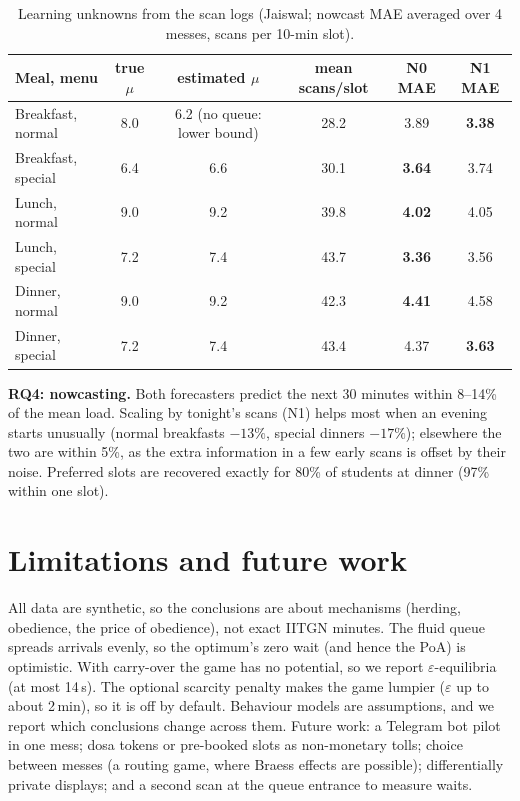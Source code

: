 \documentclass{article}
\begin{document}
\begin{table}[H]\centering\small
\caption{Learning unknowns from the scan logs (Jaiswal; nowcast MAE averaged over 4 messes, scans per 10-min slot).}\label{tab:data}
\begin{tabular}{lccccc}\toprule
Meal, menu & true $\mu$ & estimated $\mu$ & mean scans/slot & N0 MAE & N1 MAE\\\midrule
Breakfast, normal & 8.0 & 6.2 (no queue: lower bound) & 28.2 & 3.89 & \textbf{3.38}\\
Breakfast, special & 6.4 & 6.6 & 30.1 & \textbf{3.64} & 3.74\\
Lunch, normal & 9.0 & 9.2 & 39.8 & \textbf{4.02} & 4.05\\
Lunch, special & 7.2 & 7.4 & 43.7 & \textbf{3.36} & 3.56\\
Dinner, normal & 9.0 & 9.2 & 42.3 & \textbf{4.41} & 4.58\\
Dinner, special & 7.2 & 7.4 & 43.4 & 4.37 & \textbf{3.63}\\
\bottomrule\end{tabular}\end{table}

\noindent\textbf{RQ4: nowcasting.} Both forecasters predict the next 30 minutes within 8--14\% of the mean load.
Scaling by tonight's scans (N1) helps most when an evening starts unusually (normal breakfasts $-13\%$, special
dinners $-17\%$); elsewhere the two are within 5\%, as the extra information in a few early scans is offset by their
noise. Preferred slots are recovered exactly for 80\% of students at dinner (97\% within one slot).

\section{Limitations and future work}
All data are synthetic, so the conclusions are about mechanisms (herding, obedience, the price of obedience), not
exact IITGN minutes. The fluid queue spreads arrivals evenly, so the optimum's zero wait (and hence the PoA) is
optimistic. With carry-over the game has no potential, so we report $\varepsilon$-equilibria (at most 14\,s). The
optional scarcity penalty makes the game lumpier ($\varepsilon$ up to about 2\,min), so it is off by default. Behaviour
models are assumptions, and we report which conclusions change across them. Future work: a Telegram bot pilot in one
mess; dosa tokens or pre-booked slots as non-monetary tolls; choice between messes (a routing game, where Braess
effects are possible); differentially private displays; and a second scan at the queue entrance to measure waits.
\end{document}
